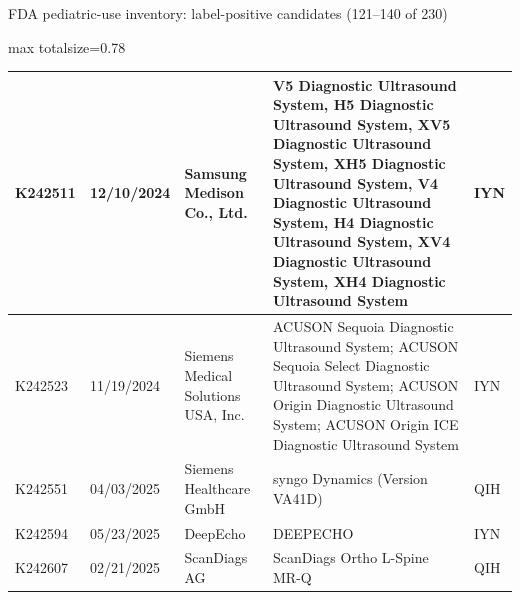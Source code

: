 \documentclass[aspectratio=169]{beamer}
\begin{document}
\begin{frame}[category=FDA appendix]{FDA pediatric-use inventory: label-positive candidates (121--140 of 230)}
\begin{adjustbox}{max totalsize={\textwidth}{0.78\textheight}}
\begin{tabular}{|p{}|p{}|p{}|p{}|p{}|}
K242511 & 12/10/2024 & Samsung Medison Co., Ltd. & V5 Diagnostic Ultrasound System, H5 Diagnostic Ultrasound System, XV5 Diagnostic Ultrasound System, XH5 Diagnostic Ultrasound System, V4 Diagnostic Ultrasound System, H4 Diagnostic Ultrasound System, XV4 Diagnostic Ultrasound System, XH4 Diagnostic Ultrasound System & IYN \\ \hline
K242523 & 11/19/2024 & Siemens Medical Solutions USA, Inc. & ACUSON Sequoia Diagnostic Ultrasound System; ACUSON Sequoia Select Diagnostic Ultrasound System; ACUSON Origin Diagnostic Ultrasound System; ACUSON Origin ICE Diagnostic Ultrasound System & IYN \\ \hline
K242551 & 04/03/2025 & Siemens Healthcare GmbH & syngo Dynamics (Version VA41D) & QIH \\ \hline
K242594 & 05/23/2025 & DeepEcho & DEEPECHO & IYN \\ \hline
K242607 & 02/21/2025 & ScanDiags AG & ScanDiags Ortho L-Spine MR-Q & QIH \\ \hline
\end{tabular}
\end{adjustbox}
\end{frame}
\end{document}
